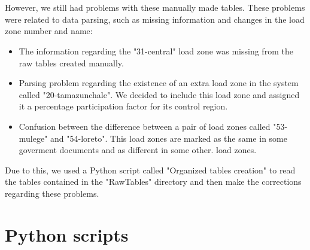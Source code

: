 \documentclass{article}
\begin{document}
\\
\\However, we still had problems with these manually made tables. These problems were related to data parsing, such as missing information and changes in the load zone number and name:
\begin{itemize}
\item The information regarding the "31-central" load zone was missing from the raw tables created manually.
\item Parsing problem regarding the existence of an extra load zone in the system called "20-tamazunchale". We decided to include this load zone and assigned it a percentage participation factor for its control region.
\item Confusion between the difference between a pair of load zones called "53-mulege" and "54-loreto". This load zones are marked as the same in some goverment documents and as different in some other.  load zones.
\end{itemize}
Due to this, we used a Python script called "Organized tables creation" to read the tables contained in the "RawTables" directory and then make the corrections regarding these problems.
\section{Python scripts}
\end{document}
